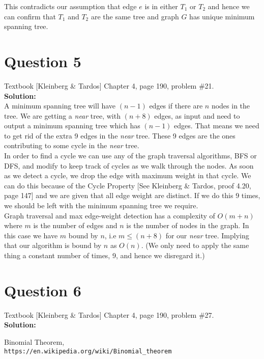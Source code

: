 \documentclass[11pt]{article}
\begin{document}
This contradicts our assumption that edge $ e $ is in either $ T_1 $ or $ T_2 $ and hence we can confirm that $ T_1 $ and $ T_2 $ are the same tree and graph $ G $ has unique minimum spanning tree.

\clearpage
\section{Question 5} Textbook [Kleinberg \& Tardos] Chapter 4, page 190, problem \#21. \\
\textbf{Solution:} \\

A minimum spanning tree will have $ (n-1) $ edges if there are $ n $ nodes in the tree. We are getting a \textit{near} tree, with $ (n+8) $ edges, as input and need to output a minimum spanning tree which has $ (n-1) $ edges. That means we need to get rid of the extra 9 edges in the \textit{near} tree. These 9 edges are the ones contributing to some cycle in the \textit{near} tree. \\

In order to find a cycle we can use any of the graph traversal algorithms, BFS or DFS, and modify to keep track of cycles as we walk through the nodes. As soon as we detect a cycle, we drop the edge with maximum weight in that cycle. We can do this because of the Cycle Property [See Kleinberg \& Tardos, proof 4.20, page 147] and we are given that all edge weight are distinct. If we do this 9 times, we should be left with the minimum spanning tree we require. \\

Graph traversal and max edge-weight detection has a complexity of $ O(m+n) $ where $ m $ is the number of edges and $ n $ is the number of nodes in the graph. In this case we have $ m $ bound by $ n $, i.e $ m \leq (n+8) $ for our \textit{near} tree. Implying that our algorithm is bound by $ n $ as $ O(n) $. (We only need to apply the same thing a constant number of times, 9, and hence we disregard it.) \\

\clearpage
\section{Question 6} Textbook [Kleinberg \& Tardos] Chapter 4, page 190, problem \#27. \\
\textbf{Solution:} \\

\clearpage

\begin{thebibliography}{9}
	Binomial Theorem,
	\\\texttt{https://en.wikipedia.org/wiki/Binomial\_theorem}
	
\end{thebibliography}
\end{document}
